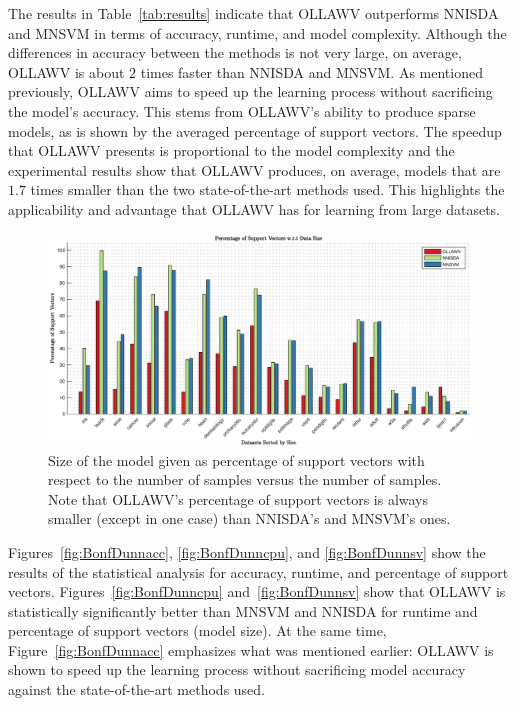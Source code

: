 \documentclass[reqno]{vcuthesis}
\numberwithin{equation}{chapter}
\begin{document}
The results in Table~\ref{tab:results} indicate that OLLAWV outperforms NNISDA and MNSVM in terms of accuracy, runtime, and model complexity. Although the differences in accuracy between the methods is not very large, on average, OLLAWV is about $2$ times faster than NNISDA and MNSVM. As mentioned previously, OLLAWV aims to speed up the learning process without sacrificing the model's accuracy. This stems from OLLAWV's ability to produce sparse models, as is shown by the averaged percentage of support vectors. The speedup that OLLAWV presents is proportional to the model complexity and the experimental results show that OLLAWV produces, on average, models that are $1.7$ times smaller than the two state-of-the-art methods used. This highlights the applicability and advantage that OLLAWV has for learning from large datasets. 

\begin{figure}[t!]
\centering
\includegraphics[trim={3.2cm 0 3.2cm 0},clip,width=\textwidth]{figures/PSV_vs_NumData.eps}
\caption{Size of the model given as percentage of support vectors with respect to the number of samples  versus the number of samples. Note that OLLAWV’s percentage of support vectors is always smaller (except in one case) than NNISDA's and MNSVM's ones.}
\label{fig:psvvssamples}
\end{figure}
Figures~\ref{fig:BonfDunnacc}, \ref{fig:BonfDunncpu}, and \ref{fig:BonfDunnsv} show the results of the statistical analysis for accuracy, runtime, and percentage of support vectors. Figures~\ref{fig:BonfDunncpu} and~\ref{fig:BonfDunnsv} show that OLLAWV is statistically significantly better than MNSVM and NNISDA for runtime and percentage of support vectors (model size). At the same time, Figure~\ref{fig:BonfDunnacc} emphasizes what was mentioned earlier: OLLAWV is shown to speed up the learning process without sacrificing model accuracy against the state-of-the-art methods used. 
\end{document}
